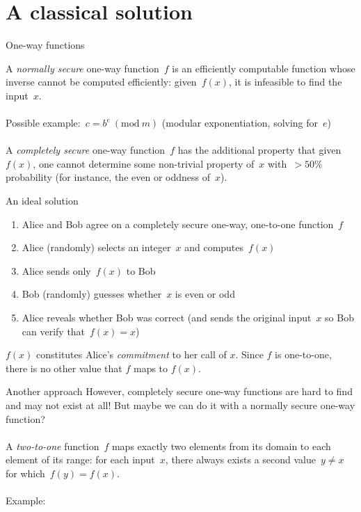 \documentclass{beamer}
\begin{document}
\part{A classical solution~\cite{blum1981coin}} \frame{\partpage}

\begin{frame}{One-way functions}
    
    A \emph{normally secure} one-way function~$f$ is an efficiently computable function whose inverse cannot be computed efficiently: given~$f(x)$, it is infeasible to find the input~$x$. \\~\\
    Possible example:~$c = b^e \ (\textrm{mod}\ m)$ (modular exponentiation, solving for~$e$)\\~\\
    
    A \emph{completely secure} one-way function~$f$ has the additional property that given~$f(x)$, one cannot determine some non-trivial property of~$x$ with~$>50\%$ probability (for instance, the even or oddness of~$x$).
\end{frame}

\begin{frame}{An ideal solution}
    \begin{enumerate}
        \item Alice and Bob agree on a completely secure one-way, one-to-one function~$f$
        \item Alice (randomly) selects an integer~$x$ and computes~$f(x)$
        \item Alice sends only~$f(x)$ to Bob
        \item Bob (randomly) guesses whether~$x$ is even or odd
        \item Alice reveals whether Bob was correct (and sends the original input~$x$ so Bob can verify that~$f(x) = x$)
    \end{enumerate}
    
    $f(x)$ constitutes Alice's \emph{commitment} to her call of $x$. Since $f$ is one-to-one, there is no other value that $f$ maps to $f(x)$.
\end{frame}


\begin{frame}{Another approach}
    However, completely secure one-way functions are hard to find and may not exist at all! But maybe we can do it with a normally secure one-way function?\\~\\
    
    A \emph{two-to-one} function~$f$ maps exactly two elements from its domain to each element of its range: for each input~$x$, there always exists a second value~$y \neq x$ for which~$f(y) = f(x)$.\\~\\
    
    Example: 
    
\end{frame}
\end{document}
